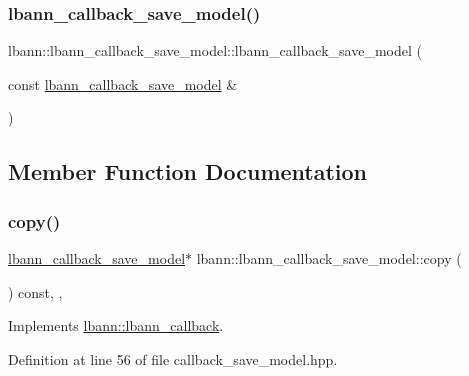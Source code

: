\subsubsection{\texorpdfstring{lbann\+\_\+callback\+\_\+save\+\_\+model()}{lbann\_callback\_save\_model()}\hspace{0.1cm}{\footnotesize\ttfamily [2/2]}}
{\footnotesize\ttfamily lbann\+::lbann\+\_\+callback\+\_\+save\+\_\+model\+::lbann\+\_\+callback\+\_\+save\+\_\+model (\begin{DoxyParamCaption}\item[{const \hyperlink{classlbann_1_1lbann__callback__save__model}{lbann\+\_\+callback\+\_\+save\+\_\+model} \&}]{ }\end{DoxyParamCaption})\hspace{0.3cm}{\ttfamily [default]}}



\subsection{Member Function Documentation}
\mbox{\label{classlbann_1_1lbann__callback__save__model_adaebfea30dcc1c32a8ae25a3307abb7f}} 
\subsubsection{\texorpdfstring{copy()}{copy()}}
{\footnotesize\ttfamily \hyperlink{classlbann_1_1lbann__callback__save__model}{lbann\+\_\+callback\+\_\+save\+\_\+model}$\ast$ lbann\+::lbann\+\_\+callback\+\_\+save\+\_\+model\+::copy (\begin{DoxyParamCaption}{ }\end{DoxyParamCaption}) const\hspace{0.3cm}{\ttfamily [inline]}, {\ttfamily [override]}, {\ttfamily [virtual]}}



Implements \hyperlink{classlbann_1_1lbann__callback_a9f545d1269a8c7af335625d049691f26}{lbann\+::lbann\+\_\+callback}.



Definition at line 56 of file callback\+\_\+save\+\_\+model.\+hpp.


